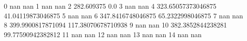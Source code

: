 0 nan nan
1 nan nan
2 282.609375 0.0
3 nan nan
4 323.65057373046875 41.04119873046875
5 nan nan
6 347.8416748046875 65.2322998046875
7 nan nan
8 399.9900817871094 117.38070678710938
9 nan nan
10 382.3852844238281 99.77590942382812
11 nan nan
12 nan nan
13 nan nan
14 nan nan
